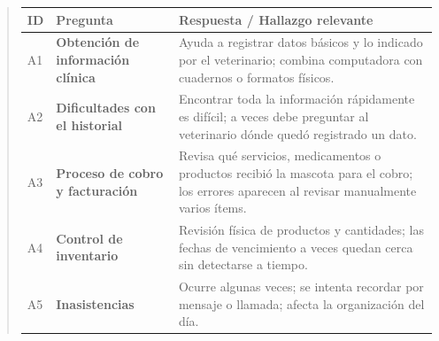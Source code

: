 \documentclass[
]{article}
\newcounter{none} %
\begin{document}
\begin{quote}
{\def\LTcaptype{none} %
\begin{longtable}[]{|
  >{\centering\arraybackslash}p{}|
  >{\raggedright\arraybackslash}p{}|
  >{\raggedright\arraybackslash}p{}|}
\hline
\begin{minipage}[b]{\linewidth}\centering
\textbf{ID}
\end{minipage} & \begin{minipage}[b]{\linewidth}\centering
\textbf{Pregunta}
\end{minipage} & \begin{minipage}[b]{\linewidth}\raggedright
\textbf{Respuesta / Hallazgo relevante}
\end{minipage} \\
\hline
\endhead
\hline
\endlastfoot
A1 & \textbf{Obtención de información clínica} &
\begin{minipage}[t]{\linewidth}\raggedright
Ayuda a registrar datos básicos y lo indicado por el veterinario; combina computadora con cuadernos o formatos físicos.
\end{minipage} \\
\hline
A2 & \textbf{Dificultades con el historial} &
\begin{minipage}[t]{\linewidth}\raggedright
Encontrar toda la información rápidamente es difícil; a veces debe preguntar al veterinario dónde quedó registrado un dato.
\end{minipage} \\
\hline
A3 & \textbf{Proceso de cobro y facturación} &
\begin{minipage}[t]{\linewidth}\raggedright
Revisa qué servicios, medicamentos o productos recibió la mascota para el cobro; los errores aparecen al revisar manualmente varios ítems.
\end{minipage} \\
\hline
A4 & \textbf{Control de inventario} &
\begin{minipage}[t]{\linewidth}\raggedright
Revisión física de productos y cantidades; las fechas de vencimiento a veces quedan cerca sin detectarse a tiempo.
\end{minipage} \\
\hline
A5 & \textbf{Inasistencias} &
\begin{minipage}[t]{\linewidth}\raggedright
Ocurre algunas veces; se intenta recordar por mensaje o llamada; afecta la organización del día.
\end{minipage} \\

\end{longtable}}
\end{quote}
\end{document}
